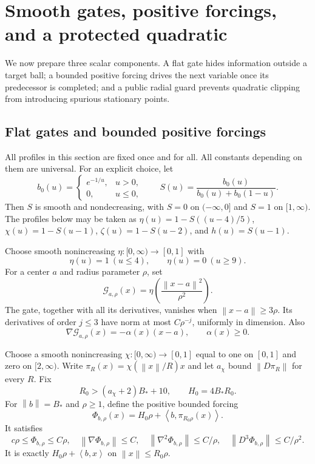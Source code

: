 \documentclass[11pt]{article}
\theoremstyle{definition}
\theoremstyle{remark}
\newcommand{\norm}[1]{\left\|#1\right\|}
\newcommand{\ip}[2]{\left\langle#1,#2\right\rangle}
\begin{document}
\section{Smooth gates, positive forcings, and a protected quadratic}
\label{sec:primitives}
We now prepare three scalar components. A flat gate hides information
outside a target ball; a bounded positive forcing drives the next
variable once its predecessor is completed; and a public radial guard
prevents quadratic clipping from introducing spurious stationary points.
\subsection{Flat gates and bounded positive forcings}
All profiles in this section are fixed once and for all. All constants depending on them are universal. For an explicit choice, let
\[
 b_0(u)=\begin{cases}e^{-1/u},&u>0,\\0,&u\le0,\end{cases}
 \qquad S(u)=\frac{b_0(u)}{b_0(u)+b_0(1-u)}.
\]
Then $S$ is smooth and nondecreasing, with $S=0$ on $(-\infty,0]$ and $S=1$ on $[1,\infty)$. The profiles below may be taken as
$\eta(u)=1-S((u-4)/5)$, $\chi(u)=1-S(u-1)$,
$\zeta(u)=1-S(u-2)$, and $h(u)=S(u-1)$.

Choose smooth nonincreasing $\eta:[0,\infty)\to[0,1]$ with
\[
 \eta(u)=1\ (u\le4),\qquad \eta(u)=0\ (u\ge9).
\]
For a center $a$ and radius parameter $\rho$, set
\begin{equation}\label{eq:gate}
 \mathcal G_{a,\rho}(x)=\eta\!\left(\frac{\norm{x-a}^2}{\rho^2}\right).
\end{equation}
The gate, together with all its derivatives, vanishes when $\norm{x-a}\ge3\rho$. Its derivatives of order $j\le3$ have norm at most $C\rho^{-j}$, uniformly in dimension. Also
\begin{equation}\label{eq:gate-sign}
 \nabla\mathcal G_{a,\rho}(x)=-\alpha(x)(x-a),\qquad \alpha(x)\ge0.
\end{equation}

Choose a smooth nonincreasing $\chi:[0,\infty)\to[0,1]$ equal to one on $[0,1]$ and zero on $[2,\infty)$. Write
$\pi_R(x)=\chi(\norm x/R)x$ and let $a_\chi$ bound $\norm{D\pi_R}$ for every $R$. Fix
\[
 R_0>(a_\chi+2)B_*+10,\qquad H_0=4B_*R_0.
\]
For $\norm b=B_*$ and $\rho\ge1$, define the positive bounded forcing
\begin{equation}\label{eq:forcing}
 \Phi_{b,\rho}(x)=H_0\rho+\ip b{\pi_{R_0\rho}(x)}.
\end{equation}
It satisfies
\begin{equation}\label{eq:forcing-bounds}
 c\rho\le\Phi_{b,\rho}\le C\rho,\quad
 \norm{\nabla\Phi_{b,\rho}}\le C,\quad
 \norm{\nabla^2\Phi_{b,\rho}}\le C/\rho,\quad
 \norm{D^3\Phi_{b,\rho}}\le C/\rho^2.
\end{equation}
It is exactly $H_0\rho+\ip b x$ on $\norm x\le R_0\rho$.
\end{document}
